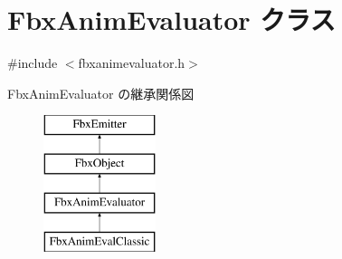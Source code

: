 \hypertarget{class_fbx_anim_evaluator}{}\section{Fbx\+Anim\+Evaluator クラス}
\label{class_fbx_anim_evaluator}


{\ttfamily \#include $<$fbxanimevaluator.\+h$>$}

Fbx\+Anim\+Evaluator の継承関係図\begin{figure}[H]
\begin{center}
\leavevmode
\includegraphics[height=4.000000cm]{class_fbx_anim_evaluator}
\end{center}
\end{figure}

